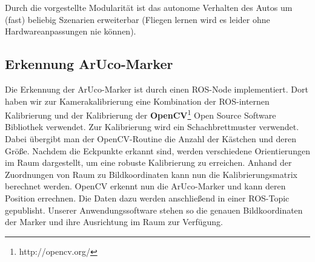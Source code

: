Durch die vorgestellte Modularität ist das autonome Verhalten des Autos um (fast) beliebig Szenarien erweiterbar (Fliegen lernen wird es leider ohne Hardwareanpassungen nie können).
\subsection{Erkennung ArUco-Marker}
Die Erkennung der ArUco-Marker ist durch einen ROS-Node implementiert. Dort haben wir zur Kamerakalibrierung eine Kombination der ROS-internen Kalibrierung und der Kalibrierung der  \textbf{OpenCV}\footnote[1]{http://opencv.org/} Open Source Software Bibliothek verwendet. Zur Kalibrierung wird ein Schachbrettmuster verwendet. Dabei übergibt man der OpenCV-Routine die Anzahl der Kästchen und deren Größe. Nachdem die Eckpunkte erkannt sind, werden verschiedene Orientierungen im Raum dargestellt, um eine robuste Kalibrierung zu erreichen. Anhand der Zuordnungen von Raum zu Bildkoordinaten kann nun die Kalibrierungsmatrix berechnet werden. 
OpenCV erkennt nun die ArUco-Marker und kann deren Position errechnen. Die Daten dazu werden anschließend in einer ROS-Topic gepublisht. Unserer Anwendungssoftware stehen so die genauen Bildkoordinaten der Marker und ihre Ausrichtung im Raum zur Verfügung.  

